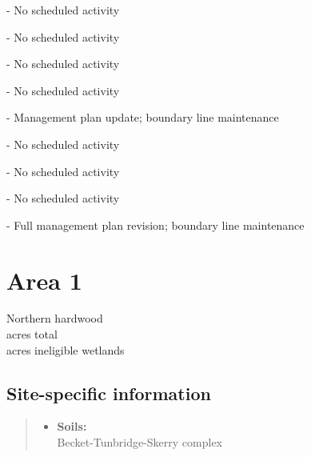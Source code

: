 \documentclass[]{tufte-handout}
\providecommand{\tightlist}{%
  \setlength{\itemsep}{0pt}\setlength{\parskip}{0pt}}
\begin{document}
 - No scheduled activity

\vspace{5pt}

 - No scheduled activity

\vspace{5pt}

 - No scheduled activity

\vspace{5pt}

 - No scheduled activity

\vspace{5pt}

 - Management plan update; boundary line maintenance

\vspace{5pt}

 - No scheduled activity

\vspace{5pt}

 - No scheduled activity

\vspace{5pt}

 - No scheduled activity

\vspace{5pt}

 - Full management plan revision; boundary line
maintenance

\newpage

\section{Area 1}\label{area-1}

Northern hardwood\\
 acres total\\
 acres ineligible wetlands

\subsection{Site-specific information}\label{site-specific-information}

\begin{quote}
\begin{itemize}
\tightlist
\item
  \textbf{Soils:}\\
  \indent\indent Becket-Tunbridge-Skerry complex
\end{itemize}
\end{quote}
\end{document}
